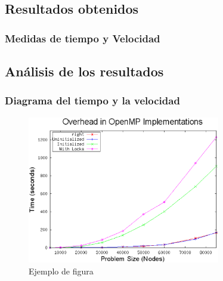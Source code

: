 \documentclass{beamer}
\begin{document}
\subsection{Resultados obtenidos}
\begin{frame}
\frametitle{Medidas de tiempo y Velocidad}



\end{frame}


\subsection{Análisis de los resultados}
\begin{frame}
\frametitle{Diagrama del tiempo y la velocidad}

\begin{figure}[!th]
\begin{center}
\includegraphics[width=0.75\textwidth]{img/figura1.eps}
\caption{Ejemplo de figura}
\label{fig:1}
\end{center}
\end{figure}

\end{frame}
\end{document}
